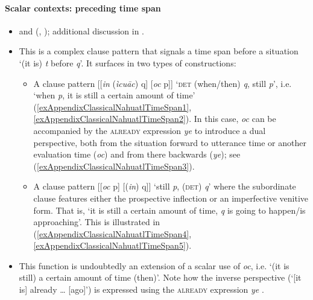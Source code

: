 \paragraph{Scalar contexts: preceding time span}
\label{appendixClassicalNahuatlTimeSpanBefore}
\begin{itemize}
	\item \textcite[501]{Carochi1645} and \citeauthor{Launey1986} (\citeyear[1268–1269]{Launey1986}, \citeyear[369]{LauneyMackay2011}); additional discussion in \textcite[308–310]{vanBaar1997}.
	\item This is a  complex clause pattern that signals a time span before a situation \lq (it is) \textit{t} before \textit{q}'. It surfaces in two types of constructions:
	\begin{itemize}
		\item A clause pattern [[\textit{in} (\textit{ìcuāc}) q] [\textit{oc} p]] \lq \textsc{det} (when/then) \textit{q}, still \textit{p}', i.e. \lq{}when \textit{p}, it is still a certain amount of time' (\ref{exAppendixClassicalNahuatlTimeSpan1}, \ref{exAppendixClassicalNahuatlTimeSpan2}). In this case, \textit{oc} can be accompanied by the \textsc{already} expression \textit{ye} to introduce a dual perspective, both from the situation forward to utterance time or another evaluation time (\textit{oc}) and from there backwards (\textit{ye}); see (\ref{exAppendixClassicalNahuatlTimeSpan3}).

	\item A clause pattern [[\textit{oc} p] [(\textit{in}) q]] \lq still \textit{p}, (\textsc{det}) \textit{q}' where the subordinate clause features either the prospective inflection or an imperfective venitive form. That is, \lq it is still a certain amount of time, \textit{q} is going to happen/is approaching'. This is illustrated in  (\ref{exAppendixClassicalNahuatlTimeSpan4}, \ref{exAppendixClassicalNahuatlTimeSpan5}).
	\end{itemize}		
	\item This function is undoubtedly an extension of a scalar use of \textit{oc}, i.e. \lq (it is still) a certain amount of time (then)'. Note how the inverse perspective (\lq [it is] already … [ago]') is expressed using the \textsc{already} expression \textit{ye} \parencite[1258]{Launey1986}.
\end{itemize}
\largerpage[2]

